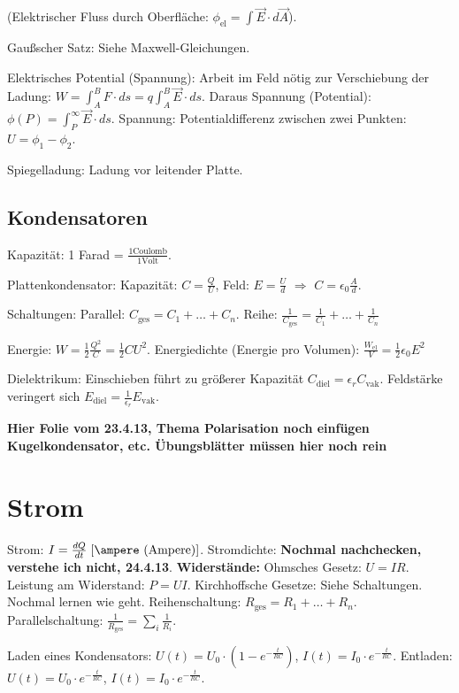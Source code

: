 \documentclass[a4paper,german,12pt,smallheadings]{scrartcl}
\begin{document}
(Elektrischer Fluss durch Oberfläche: $\phi_{\text{el}} = \int \vec{E} \cdot d\vec{A}$).

Gaußscher Satz: Siehe Maxwell-Gleichungen.

Elektrisches Potential (Spannung): Arbeit im Feld nötig zur Verschiebung der
Ladung: $W = \int_A^B F \cdot ds = q \int_A^B \vec{E} \cdot ds$. Daraus
Spannung (Potential): $\phi(P) = \int_P^\infty \vec{E} \cdot ds$. Spannung:
Potentialdifferenz zwischen zwei Punkten: $U = \phi_1 - \phi_2$.

Spiegelladung: Ladung vor leitender Platte.

\subsection{Kondensatoren}
Kapazität: 1 Farad = $\frac{1 \text{Coulomb}}{1 \text{Volt}}$. 

Plattenkondensator: Kapazität: $C =\frac{Q}{U}$, Feld: $E = \frac{U}{d}$ $\Rightarrow$ $C = \epsilon_0 \frac{A}{d}$.

Schaltungen: Parallel: $C_{\text{ges}} = C_1 + \dots + C_n$. Reihe: $\frac{1}{C_{\text{ges}}} = \frac{1}{C_1} + \dots + \frac{1}{C_n}$

Energie: $W = \frac{1}{2} \frac{Q^2}{C} = \frac{1}{2} CU^2$. Energiedichte (Energie pro Volumen): $\frac{W_{\text{el}}}{V} = \frac{1}{2} \epsilon_0 E^2$

Dielektrikum: Einschieben führt zu größerer Kapazität $C_{\text{diel}} =
\epsilon_r C_{\text{vak}}$. Feldstärke veringert sich $E_{\text{diel}} =
\frac{1}{\epsilon_r} E_{\text{vak}}$.

\textbf{Hier Folie vom 23.4.13, Thema Polarisation noch einfügen}
\textbf{Kugelkondensator, etc. Übungsblätter müssen hier noch rein}

\section{Strom}
Strom: $I = \frac{dQ}{dt}\; [\ampere\text{ (Ampere)}]$. Stromdichte:
\textbf{Nochmal nachchecken, verstehe ich nicht, 24.4.13}.
\textbf{Widerstände:} Ohmsches Gesetz: $U = IR$. Leistung am Widerstand:
$P=UI$. Kirchhoffsche Gesetze: Siehe Schaltungen. Nochmal lernen wie geht.
Reihenschaltung: $R_{\text{ges}} = R_1 + \dots + R_n$. Parallelschaltung:
$\frac{1}{R_{\text{ges}}} = \sum_i \frac{1}{R_i}$.

Laden eines Kondensators: $U(t) = U_0 \cdot (1 - e^{-\frac{t}{RC}})$, $I(t) =
I_0 \cdot e^{-\frac{t}{RC}}$.
Entladen: $U(t) = U_0 \cdot e^{-\frac{t}{RC}}$, $I(t) =
I_0 \cdot e^{-\frac{t}{RC}}$.
\end{document}
